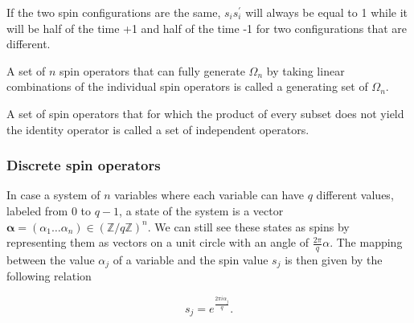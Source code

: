 \noindent
If the two spin configurations are the same, $s_i s_i^\prime$ will always be equal to 1 while it will be half of the time +1 and half of the time -1 for two configurations that are different.

\begin{definition}
    A set of $n$ spin operators that can fully generate $\Omega_n$ by taking linear combinations of the individual spin operators is called a generating set of $\Omega_n$.
\end{definition}

\begin{definition}
    A set of spin operators that for which the product of every subset does not yield the identity operator is called a set of independent operators.
\end{definition}

\subsubsection{Discrete spin operators}

In case a system of $n$ variables where each variable can have $q$ different values, labeled from $0$ to $q-1$, a state of the system is a vector $\boldsymbol{\alpha}= (\alpha_1 \dots \alpha_n) \in {(\mathbb{Z}/q\mathbb{Z})}^n$.
We can still see these states as spins by representing them as vectors on a unit circle with an angle of $\frac{2\pi}{q}\alpha$.
The mapping between the value $\alpha_j$ of a variable and the spin value $s_j$ is then given by the following relation

\begin{equation}
    s_j = e^{\frac{2\pi i \alpha_j}{q}}.
\end{equation}

